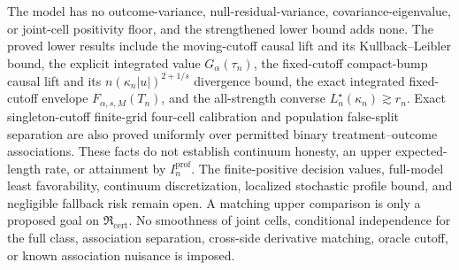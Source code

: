 \documentclass{article}
\begin{document}
The model has no outcome-variance, null-residual-variance, covariance-eigenvalue, or joint-cell positivity floor, and the strengthened lower bound adds none. The proved lower results include the moving-cutoff causal lift and its Kullback--Leibler bound, the explicit integrated value \(G_\alpha(\tau_n)\), the fixed-cutoff compact-bump causal lift and its \(n(\kappa_n|u|)^{2+1/s}\) divergence bound, the exact integrated fixed-cutoff envelope \(F_{\alpha,s,M}(T_n)\), and the all-strength converse \(L_n^\star(\kappa_n)\gtrsim r_n\). Exact singleton-cutoff finite-grid four-cell calibration and population false-split separation are also proved uniformly over permitted binary treatment--outcome associations. These facts do not establish continuum honesty, an upper expected-length rate, or attainment by \(I_n^{\mathrm{prof}}\). The finite-positive decision values, full-model least favorability, continuum discretization, localized stochastic profile bound, and negligible fallback risk remain open. A matching upper comparison is only a proposed goal on \(\mathfrak R_{\mathrm{cert}}\). No smoothness of joint cells, conditional independence for the full class, association separation, cross-side derivative matching, oracle cutoff, or known association nuisance is imposed.
\end{document}

